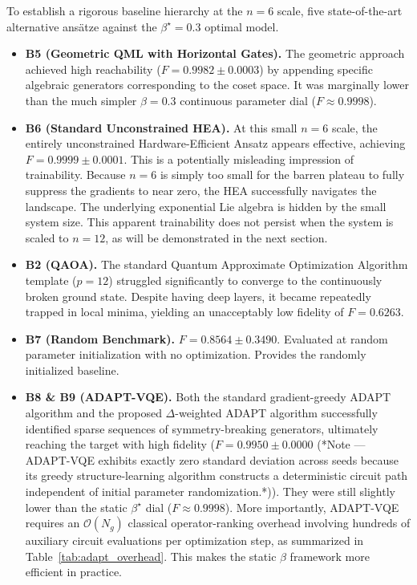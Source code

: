 \documentclass[pdflatex,sn-mathphys-num]{sn-jnl}
\theoremstyle{thmstyleone}
\theoremstyle{thmstyletwo}
\theoremstyle{thmstylethree}
\begin{document}
To establish a rigorous baseline hierarchy at the $n=6$ scale, five state-of-the-art alternative ans\"atze against the $\beta^\star = 0.3$ optimal model.
\begin{itemize}
    \item \textbf{B5 (Geometric QML with Horizontal Gates).} The geometric approach achieved high reachability ($F=0.9982 \pm 0.0003$) by appending specific algebraic generators corresponding to the coset space. It was marginally lower than the much simpler $\beta=0.3$ continuous parameter dial ($F \approx 0.9998$).
    \item \textbf{B6 (Standard Unconstrained HEA).} At this small $n=6$ scale, the entirely unconstrained Hardware-Efficient Ansatz appears effective, achieving $F=0.9999 \pm 0.0001$. This is a potentially misleading impression of trainability. Because $n=6$ is simply too small for the barren plateau to fully suppress the gradients to near zero, the HEA successfully navigates the landscape. The underlying exponential Lie algebra is hidden by the small system size. This apparent trainability does not persist when the system is scaled to $n=12$, as will be demonstrated in the next section.
    \item \textbf{B2 (QAOA).} The standard Quantum Approximate Optimization Algorithm template ($p=12$) struggled significantly to converge to the continuously broken ground state. Despite having deep layers, it became repeatedly trapped in local minima, yielding an unacceptably low fidelity of $F=0.6263$.
    \item \textbf{B7 (Random Benchmark).} $F=0.8564 \pm 0.3490$. Evaluated at random parameter initialization with no optimization. Provides the randomly initialized baseline.
    \item \textbf{B8 \& B9 (ADAPT-VQE).} Both the standard gradient-greedy ADAPT algorithm and the proposed $\Delta$-weighted ADAPT algorithm successfully identified sparse sequences of symmetry-breaking generators, ultimately reaching the target with high fidelity ($F=0.9950 \pm 0.0000$ (*Note --- ADAPT-VQE exhibits exactly zero standard deviation across seeds because its greedy structure-learning algorithm constructs a deterministic circuit path independent of initial parameter randomization.*)). They were still slightly lower than the static $\beta^\star$ dial ($F \approx 0.9998$). More importantly, ADAPT-VQE requires an $\mathcal{O}(N_g)$ classical operator-ranking overhead involving hundreds of auxiliary circuit evaluations per optimization step, as summarized in Table~\ref{tab:adapt_overhead}. This makes the static $\beta$ framework more efficient in practice.
\end{itemize}
\end{document}
